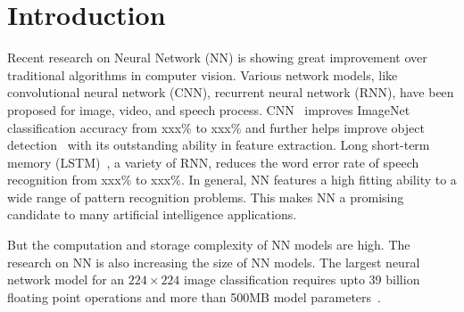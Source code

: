 \section{Introduction}

Recent research on Neural Network (NN) is showing great improvement over traditional algorithms in computer vision. Various network models, like convolutional neural network (CNN), recurrent neural network (RNN), have been proposed for image, video, and speech process. CNN~\cite{} improves ImageNet~\cite{} classification accuracy from xxx\% to xxx\% and further helps improve object detection~\cite{} with its outstanding ability in feature extraction. Long short-term memory (LSTM)~\cite{}, a variety of RNN, reduces the word error rate of speech recognition from xxx\% to xxx\%. In general, NN features a high fitting ability to a wide range of pattern recognition problems. This makes NN a promising candidate to many artificial intelligence applications.

But the computation and storage complexity of NN models are high. The research on NN is also increasing the size of NN models. The largest neural network model for an $224\times224$ image classification requires upto 39 billion floating point operations and more than 500MB model parameters~\cite{}. 